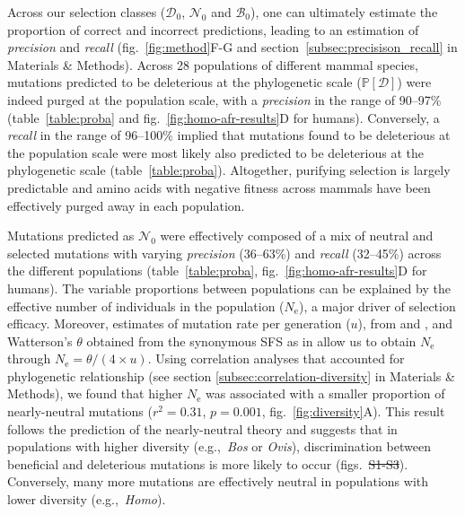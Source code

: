 \documentclass{article}
\newcommand{\Ne}{N_{\text{e}}}
\newcommand{\proba}{\mathbb{P}}
\newcommand{\SphyDel}{\mathcal{D}_0}
\newcommand{\SphyNeu}{\mathcal{N}_0}
\newcommand{\SphyBen}{\mathcal{B}_0}
\newcommand{\SpopDel}{\mathcal{D}}
\newcommand{\ProbaPopDel}{\proba [ \SpopDel]}
\providecommand{\DIFaddtex}[1]{{\protect\color{blue}\uwave{#1}}} %
\providecommand{\DIFdeltex}[1]{{\protect\color{red}\sout{#1}}}                      %
\providecommand{\DIFaddbegin}{} %
\providecommand{\DIFaddend}{} %
\providecommand{\DIFdelbegin}{} %
\providecommand{\DIFdelend}{} %
\providecommand{\DIFadd}[1]{\texorpdfstring{\DIFaddtex{#1}}{#1}} %
\providecommand{\DIFdel}[1]{\texorpdfstring{\DIFdeltex{#1}}{}} %
\newcommand{\DIFscaledelfig}{0.5}
\newlength{\DIFdelgraphicswidth} %
\newlength{\DIFdelgraphicsheight} %
\newcommand{\DIFaddincludegraphics}[2][]{{\color{blue}\fbox{\DIFOincludegraphics[#1]{#2}}}} %
\newcommand{\DIFdelincludegraphics}[2][]{%
\sbox{\DIFdelgraphicsbox}{\DIFOincludegraphics[#1]{#2}}%
\settoboxwidth{\DIFdelgraphicswidth}{\DIFdelgraphicsbox} %
\settoboxtotalheight{\DIFdelgraphicsheight}{\DIFdelgraphicsbox} %
\scalebox{\DIFscaledelfig}{%
\parbox[b]{\DIFdelgraphicswidth}{\usebox{\DIFdelgraphicsbox}\\[-\baselineskip] \rule{\DIFdelgraphicswidth}{0em}}\llap{\resizebox{\DIFdelgraphicswidth}{\DIFdelgraphicsheight}{%
\setlength{\unitlength}{\DIFdelgraphicswidth}%
\begin{picture}(1,1)%
\thicklines\linethickness{2pt} %
{\color[rgb]{1,0,0}\put(0,0){\framebox(1,1){}}}%
{\color[rgb]{1,0,0}\put(0,0){\line( 1,1){1}}}%
{\color[rgb]{1,0,0}\put(0,1){\line(1,-1){1}}}%
\end{picture}%
}\hspace*{3pt}}} %
} %
\DeclareRobustCommand{\DIFaddbegin}{\DIFOaddbegin \let\includegraphics\DIFaddincludegraphics} %
\DeclareRobustCommand{\DIFaddend}{\DIFOaddend \let\includegraphics\DIFOincludegraphics} %
\DeclareRobustCommand{\DIFdelbegin}{\DIFOdelbegin \let\includegraphics\DIFdelincludegraphics} %
\DeclareRobustCommand{\DIFdelend}{\DIFOaddend \let\includegraphics\DIFOincludegraphics} %
\begin{document}
    Across our selection classes ($\SphyDel$, $\SphyNeu$ and $\SphyBen$), one can ultimately estimate the proportion of correct and incorrect predictions, leading to an estimation of \textit{precision} and \textit{recall} (fig.~\ref{fig:method}F-G and section~\ref{subsec:precisison_recall} in Materials \& Methods).
    Across 28 populations of different mammal species, mutations predicted to be deleterious at the phylogenetic scale (\DIFdelbegin \DIFdel{$\ProbaPopDel$}\DIFdelend \DIFaddbegin \DIFadd{$\SphyDel$}\DIFaddend ) were indeed purged at the population scale, with a \textit{precision} in the range of 90--97\% (table~\ref{table:proba} and fig.~\ref{fig:homo-afr-results}D for humans).
    Conversely, a \textit{recall} in the range of 96--100\% implied that mutations found to be deleterious at the population scale were most likely also predicted to be deleterious at the phylogenetic scale (table~\ref{table:proba}).
    Altogether, purifying selection is largely predictable and amino acids with negative fitness across mammals have been effectively purged away in each population.

    Mutations predicted as $\SphyNeu$ were effectively composed of a mix of neutral and selected mutations with varying \textit{precision} (36--63\%) and \textit{recall} (32--45\%) across the different populations (table~\ref{table:proba}, fig.~\ref{fig:homo-afr-results}D for humans).
    The variable proportions between populations can be explained by the effective number of individuals in the population ($\Ne$), a major driver of selection efficacy.
    Moreover, estimates of mutation rate per generation ($u$), from \textcite{bergeron_evolution_2023} and \textcite{orlando_recalibrating_2013}, and Watterson’s $\theta$ obtained from the synonymous SFS as in \textcite{achaz_frequency_2009}\DIFaddbegin \DIFadd{, }\DIFaddend allow us to obtain $\Ne$ through \DIFdelbegin \DIFdel{$\Ne=\theta/(4 \times u)$}\DIFdelend \DIFaddbegin \DIFadd{$\Ne=\theta/4 u)$}\DIFaddend .
    Using correlation analyses that accounted for phylogenetic relationship (see section \ref{subsec:correlation-diversity} in Materials \& Methods), we found that higher $\Ne$ was associated with a smaller proportion of nearly-neutral mutations ($r^2=0.31$, $p=0.001$, fig.~\ref{fig:diversity}A).
    This result follows the prediction of the nearly-neutral theory and suggests that in populations with higher diversity (e.g.,~\textit{Bos} or \textit{Ovis}), discrimination between beneficial and deleterious mutations is more likely to occur (figs.~\DIFdelbegin \DIFdel{S1-S3}\DIFdelend \DIFaddbegin \DIFadd{S3-S5}\DIFaddend ).
    Conversely, many more mutations are effectively neutral in populations with lower diversity (e.g.,~\textit{Homo}).
\end{document}
